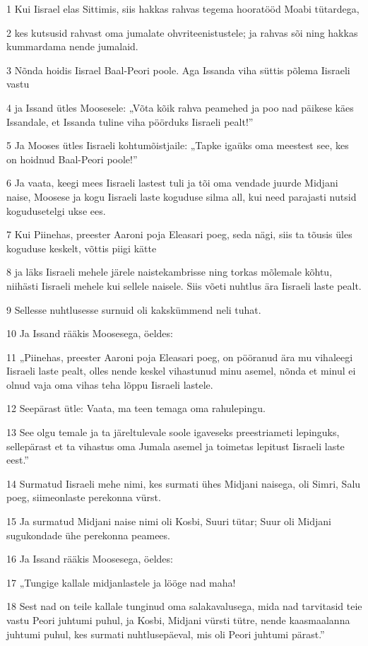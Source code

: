 \par 1 Kui Iisrael elas Sittimis, siis hakkas rahvas tegema hooratööd Moabi tütardega,
\par 2 kes kutsusid rahvast oma jumalate ohvriteenistustele; ja rahvas sõi ning hakkas kummardama nende jumalaid.
\par 3 Nõnda hoidis Iisrael Baal-Peori poole. Aga Issanda viha süttis põlema Iisraeli vastu
\par 4 ja Issand ütles Moosesele: „Võta kõik rahva peamehed ja poo nad päikese käes Issandale, et Issanda tuline viha pöörduks Iisraeli pealt!”
\par 5 Ja Mooses ütles Iisraeli kohtumõistjaile: „Tapke igaüks oma meestest see, kes on hoidnud Baal-Peori poole!”
\par 6 Ja vaata, keegi mees Iisraeli lastest tuli ja tõi oma vendade juurde Midjani naise, Moosese ja kogu Iisraeli laste koguduse silma all, kui need parajasti nutsid kogudusetelgi ukse ees.
\par 7 Kui Piinehas, preester Aaroni poja Eleasari poeg, seda nägi, siis ta tõusis üles koguduse keskelt, võttis piigi kätte
\par 8 ja läks Iisraeli mehele järele naistekambrisse ning torkas mõlemale kõhtu, niihästi Iisraeli mehele kui sellele naisele. Siis võeti nuhtlus ära Iisraeli laste pealt.
\par 9 Sellesse nuhtlusesse surnuid oli kakskümmend neli tuhat.
\par 10 Ja Issand rääkis Moosesega, öeldes:
\par 11 „Piinehas, preester Aaroni poja Eleasari poeg, on pööranud ära mu vihaleegi Iisraeli laste pealt, olles nende keskel vihastunud minu asemel, nõnda et minul ei olnud vaja oma vihas teha lõppu Iisraeli lastele.
\par 12 Seepärast ütle: Vaata, ma teen temaga oma rahulepingu.
\par 13 See olgu temale ja ta järeltulevale soole igaveseks preestriameti lepinguks, sellepärast et ta vihastus oma Jumala asemel ja toimetas lepitust Iisraeli laste eest.”
\par 14 Surmatud Iisraeli mehe nimi, kes surmati ühes Midjani naisega, oli Simri, Salu poeg, siimeonlaste perekonna vürst.
\par 15 Ja surmatud Midjani naise nimi oli Kosbi, Suuri tütar; Suur oli Midjani sugukondade ühe perekonna peamees.
\par 16 Ja Issand rääkis Moosesega, öeldes:
\par 17 „Tungige kallale midjanlastele ja lööge nad maha!
\par 18 Sest nad on teile kallale tunginud oma salakavalusega, mida nad tarvitasid teie vastu Peori juhtumi puhul, ja Kosbi, Midjani vürsti tütre, nende kaasmaalanna juhtumi puhul, kes surmati nuhtlusepäeval, mis oli Peori juhtumi pärast.”

